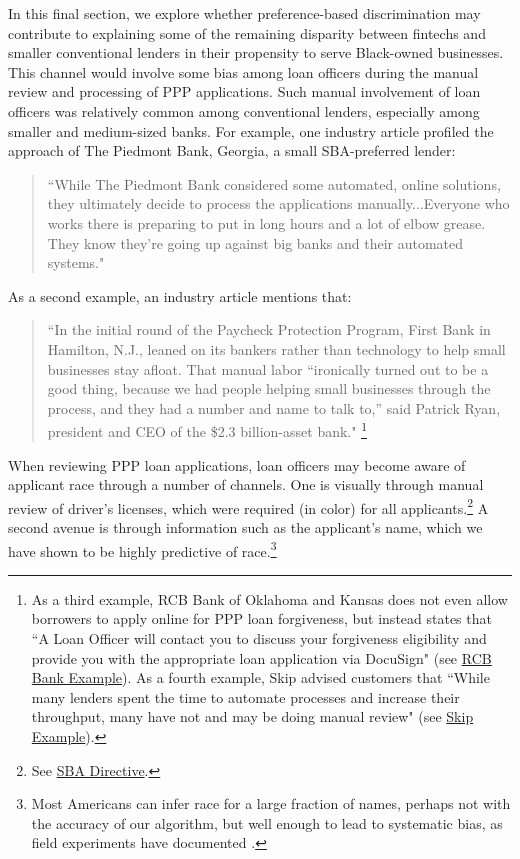 \documentclass[11pt]{article}
\begin{document}
In this final section, we explore whether preference-based discrimination may contribute to explaining some of the remaining disparity between fintechs and smaller conventional lenders in their propensity to serve Black-owned businesses. This channel would involve some bias among loan officers during the manual review and processing of PPP applications. Such manual involvement of loan officers was relatively common among conventional lenders, especially among smaller and medium-sized banks. For example, one industry article profiled the approach of The Piedmont Bank, Georgia, a small SBA-preferred lender:\begin{quote}``While The Piedmont Bank considered some automated, online solutions, they ultimately decide to process the applications manually...Everyone who works there is preparing to put in long hours and a lot of elbow grease. They know they’re going up against big banks and their automated systems." \citep{smith2020}\end{quote}  As a second example, an industry article mentions that: \begin{quote}``In the initial round of the Paycheck Protection Program, First Bank in Hamilton, N.J., leaned on its bankers rather than technology to help small businesses stay afloat. That manual labor “ironically turned out to be a good thing, because we had people helping small businesses through the process, and they had a number and name to talk to,” said Patrick Ryan, president and CEO of the \$2.3 billion-asset bank." \citep{Cross2020}\footnote{As a third example, RCB Bank of Oklahoma and Kansas does not even allow borrowers to apply online for PPP loan forgiveness, but instead states that ``A Loan Officer will contact you to discuss your forgiveness eligibility and provide you with the appropriate loan application via DocuSign" (see \href{https://rcbbank.com/sba-paycheck-protection-program-forgiveness-information/}{RCB Bank Example}). As a fourth example, Skip advised customers that ``While many lenders spent the time to automate processes and increase their throughput, many have not and may be doing manual review" (see \href{https://helloskip.com/blog/what-happens-if-you-are-rejected-for-a-ppp-loan/}{Skip Example}).}\end{quote}

\noindent When reviewing PPP loan applications, loan officers may become aware of applicant race through a number of channels. One is visually through manual review of driver's licenses, which were required (in color) for all applicants.\footnote{See \href{https://www.sba.com/funding-a-business/government-small-business-loans/ppp/how-to-complete-paycheck-protection-program}{SBA Directive}.} A second avenue is through information such as the applicant's name, which we have shown to be highly predictive of race.\footnote{Most Americans can infer race for a large fraction of names, perhaps not with the accuracy of our algorithm, but well enough to lead to systematic bias, as field experiments have documented \citep{bertrand2004emily,milkman2012temporal,bartovs2016attention}.} 
\end{document}
